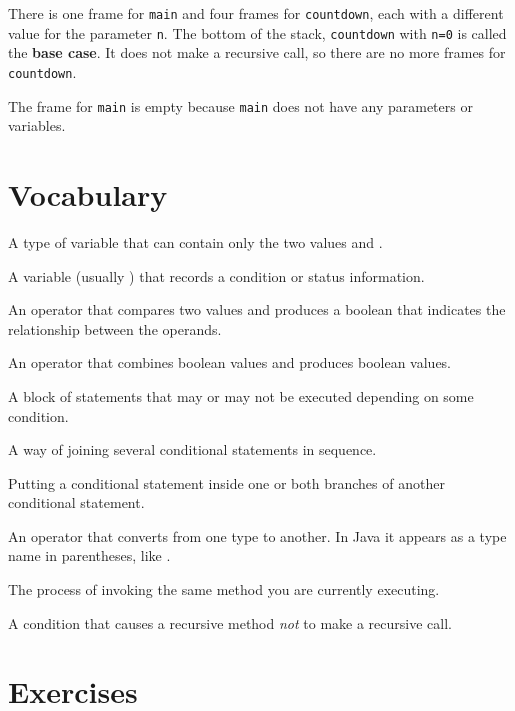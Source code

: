 \documentclass[12pt]{book}
\begin{document}
There is one frame for {\tt main} and four frames for {\tt countdown}, each with a different value for the parameter {\tt n}.
The bottom of the stack, {\tt countdown} with {\tt n=0} is called the {\bf base case}.
It does not make a recursive call, so there are no more frames for {\tt countdown}.

The frame for {\tt main} is empty because {\tt main} does not have any parameters or variables.


\section{Vocabulary}

\begin{description}

A type of variable that can contain only the two values  and .

A variable (usually ) that records a condition or status information.

An operator that compares two values and produces a boolean that indicates the relationship between the operands.

An operator that combines boolean values and produces boolean values.

A block of statements that may or may not be executed depending on some condition.

A way of joining several conditional statements in sequence.

Putting a conditional statement inside one or both branches of another conditional statement.

An operator that converts from one type to another.
In Java it appears as a type name in parentheses, like .

The process of invoking the same method you are currently executing.

A condition that causes a recursive method {\em not} to make a recursive call.

\end{description}


\section{Exercises}
\end{document}
